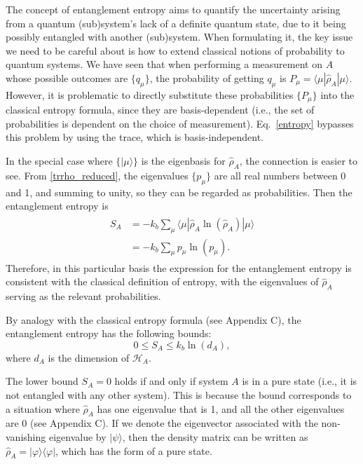\documentclass[pra,12pt]{revtex4}
\begin{document}
The concept of entanglement entropy aims to quantify the uncertainty
arising from a quantum (sub)system's lack of a definite quantum state,
due to it being possibly entangled with another (sub)system.  When
formulating it, the key issue we need to be careful about is how to
extend classical notions of probability to quantum systems.  We have
seen that when performing a measurement on $A$ whose possible outcomes
are $\{q_\mu\}$, the probability of getting $q_\mu$ is $P_\mu =
\langle \mu | \hat{\rho}_A|\mu\rangle$.  However, it is problematic to
directly substitute these probabilities $\{P_\mu\}$ into the classical
entropy formula, since they are basis-dependent (i.e., the set of
probabilities is dependent on the choice of measurement).
Eq.~\eqref{entropy} bypasses this problem by using the trace, which is
basis-independent.

In the special case where $\{|\mu\rangle\}$ is the eigenbasis for
$\hat{\rho}_A$, the connection is easier to see.  From
\eqref{trrho_reduced}, the eigenvalues $\{p_\mu\}$ are all real numbers
between 0 and 1, and summing to unity, so they can be regarded as
probabilities.  Then the entanglement entropy is
\begin{align}
  \begin{aligned}
    S_A &= -k_b \sum_\mu \langle \mu | \hat{\rho}_A \ln(\hat{\rho}_A) | \mu\rangle  \\
    &= - k_b \sum_\mu p_\mu \ln(p_\mu).
  \end{aligned}
\end{align}
Therefore, in this particular basis the expression for the
entanglement entropy is consistent with the classical definition of
entropy, with the eigenvalues of $\hat{\rho}_A$ serving as the
relevant probabilities.

By analogy with the classical entropy formula (see Appendix C), the
entanglement entropy has the following bounds:
\begin{equation}
  0 \le S_A \le k_b\ln(d_A),
  \label{Sabounds}
\end{equation}
where $d_A$ is the dimension of $\mathscr{H}_A$.

The lower bound $S_A = 0$ holds if and only if system $A$ is in a pure
state (i.e., it is not entangled with any other system).  This is
because the bound corresponds to a situation where $\hat{\rho}_A$ has
one eigenvalue that is 1, and all the other eigenvalues are 0 (see
Appendix C).  If we denote the eigenvector associated with the
non-vanishing eigenvalue by $|\psi\rangle$, then the density matrix
can be written as $\hat{\rho}_A = |\varphi\rangle\langle\varphi|$, which
has the form of a pure state.
\end{document}
